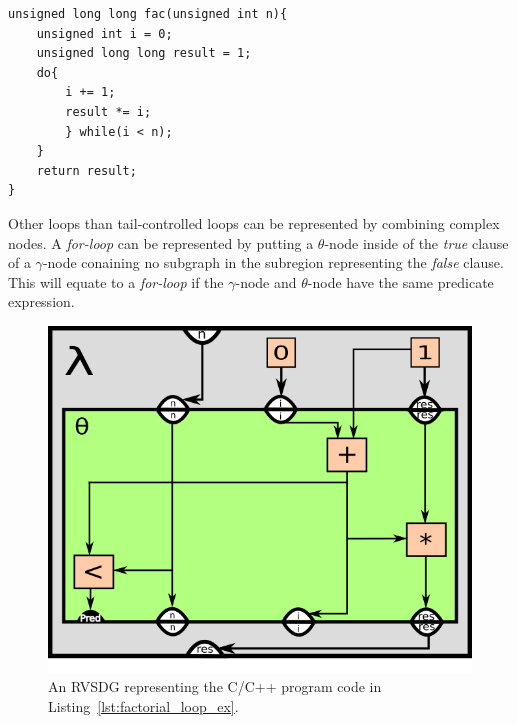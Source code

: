 \begin{itemize}
\begin{centering}
	\noindent\begin{minipage}{\textwidth}
		\begin{CenteredBox}
		\begin{lstlisting}[style=global_customcpp]
unsigned long long fac(unsigned int n){
	unsigned int i = 0;
	unsigned long long result = 1;
	do{
		i += 1;
		result *= i;
		} while(i < n);
	}
	return result;
}
		\end{lstlisting}
		\end{CenteredBox}
	\end{minipage}
	\label{lst:factorial_loop_ex}
\end{centering}

Other loops than tail-controlled loops can be represented by combining complex
nodes. A \textit{for-loop} can be represented by putting a $\theta$-node inside
of the \textit{true} clause of a $\gamma$-node conaining no subgraph in the
subregion representing the \textit{false} clause. This will equate to a
\textit{for-loop} if the $\gamma$-node and $\theta$-node have the same predicate
expression.

\begin{figure}[H]
	\centering
	\includegraphics[width=\textwidth]{figures/iterative_factorial_ex}
	\caption{An RVSDG representing the C/C++ program code in
Listing~\ref{lst:factorial_loop_ex}.}
	\label{fig:factorial_loop_ex}
\end{figure}


\end{itemize}

